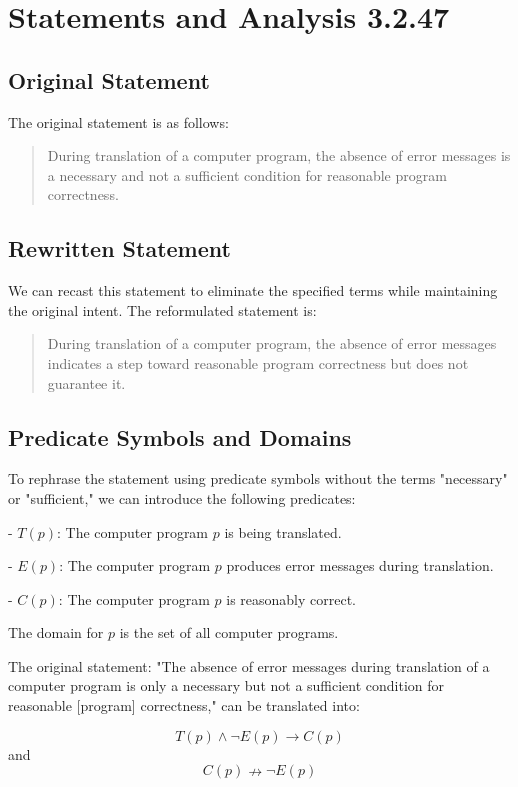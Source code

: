 \documentclass[12pt]{article}
\begin{document}
\section{Statements and Analysis 3.2.47}

\subsection{Original Statement}
The original statement is as follows:
\begin{quote}
During translation of a computer program, the absence of error messages is a necessary and not a sufficient condition for reasonable program correctness.
\end{quote}

\subsection{Rewritten Statement}
We can recast this statement to eliminate the specified terms while maintaining the original intent. The reformulated statement is:
\begin{quote}
During translation of a computer program, the absence of error messages indicates a step toward reasonable program correctness but does not guarantee it.
\end{quote}

\subsection{Predicate Symbols and Domains}

To rephrase the statement using predicate symbols without the terms "necessary" or "sufficient," we can introduce the following predicates:

- \( T(p) \): The computer program \( p \) is being translated.\par
- \( E(p) \): The computer program \( p \) produces error messages during translation.\par
- \( C(p) \): The computer program \( p \) is reasonably correct.\par

The domain for \( p \) is the set of all computer programs.

The original statement: "The absence of error messages during translation of a computer program is only a necessary but not a sufficient condition for reasonable [program] correctness," can be translated into:

\[
T(p) \land \lnot E(p) \rightarrow C(p)
\]
and
\[
C(p) \nrightarrow \lnot E(p)
\]
\end{document}
